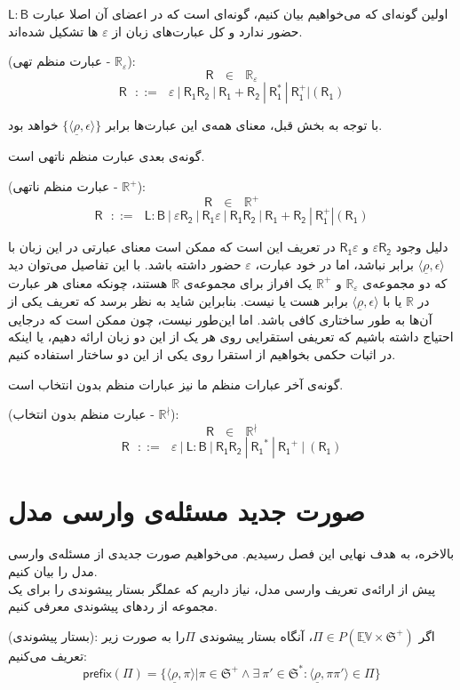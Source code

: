 اولین گونه‌ای که می‌خواهیم بیان کنیم، گونه‌ای است که در اعضای آن اصلا عبارت 
$\mathsf{L : B}$
حضور ندارد و کل عبارت‌های زبان از $\varepsilon$ ها تشکیل شده‌اند.
\begin{defn}
	(عبارت منظم تهی - $\mathbb{R_\varepsilon}$): 
	$$\mathsf{R} \:\:\:\in\:\:\: \mathbb{R}_\varepsilon$$
	$$\mathsf{R}\:\:\: ::= \:\:\: \varepsilon \: | \: \mathsf{R_1 R_2} \: | 
	\: \mathsf{R_1 + R_2} \: | \: \mathsf{R_1^*} \: | \: \mathsf{R_1^+} | (\mathsf{R_1})$$
\end{defn}


 با توجه به بخش قبل، معنای همه‌ی این عبارت‌ها برابر 
$\{\langle \underline{\rho} , \epsilon \rangle\}$
خواهد بود.

گونه‌ی بعدی عبارت منظم ناتهی است.
\begin{defn}
	(عبارت منظم ناتهی - $\mathbb{R}^+$):
	$$\mathsf{R} \:\:\:\in\:\:\: \mathbb{R}^+$$
	$$\mathsf{R}\:\:\: ::= \:\:\: \mathsf{L:B} \: |
	\: \mathsf{\varepsilon R_2} \: | \: \mathsf{R_1 \varepsilon} \: |
	\: \mathsf{R_1 R_2} \: | 
	\: \mathsf{R_1 + R_2} \: | \: \mathsf{R_1^+} | (\mathsf{R_1})$$
\end{defn}
دلیل وجود 
$\mathsf{\varepsilon R_2}$
و 
$\mathsf{R_1 \varepsilon}$
در تعریف این است که ممکن است معنای عبارتی در این زبان با ${\langle \underline{\rho} , \epsilon \rangle}$ برابر نباشد، اما در خود عبارت، $\varepsilon$ حضور داشته باشد. با این تفاصیل می‌توان دید که دو مجموعه‌ی 
$\mathbb{R}_\varepsilon$
و
$\mathbb{R}^+$
یک افراز برای مجموعه‌ی $\mathbb{R}$ هستند، چونکه معنای هر عبارت در $\mathbb{R}$ یا با ${\langle \underline{\rho} , \epsilon \rangle}$ برابر هست یا نیست. بنابراین شاید به نظر برسد که تعریف یکی از آن‌ها به طور ساختاری کافی باشد. اما این‌طور نیست، چون ممکن است که درجایی احتیاج داشته باشیم که تعریفی استقرایی روی هر یک از این دو زبان ارائه دهیم، یا اینکه در اثبات حکمی بخواهیم از استقرا روی یکی از این دو ساختار استفاده کنیم.

گونه‌ی آخر عبارات منظم ما نیز عبارات منظم بدون انتخاب است.
\begin{defn}
(عبارت منظم بدون انتخاب - $\mathbb{R}^\nmid$):
$$
\mathsf{R}\:\:\: \in \:\:\: \mathbb{R}^\nmid$$
$$
\mathsf{R}\:\:\: ::= \:\:\: \varepsilon \: | \: \mathsf{L:B} \: | \:
\mathsf{R_1 R_2} \: | \: \mathsf{R_1}^* \: | \: \mathsf{R_1}^+ \: | \:
(\mathsf{R_1})$$
\end{defn}

\section{صورت جدید مسئله‌ی وارسی مدل}
بالاخره، به هدف نهایی این فصل رسیدیم. می‌خواهیم صورت جدیدی از مسئله‌ی وارسی مدل را بیان ‌کنیم.\\
پیش از ارائه‌ی تعریف وارسی مدل، نیاز داریم که عملگر بستار پیشوندی را برای یک مجموعه از ردهای پیشوندی معرفی کنیم.
\begin{defn}
	(بستار پیشوندی):
	اگر 
	$\Pi \in \mathit{P}(\mathbb{\underline{EV}\times \mathfrak{S}^+})$،
	آنگاه بستار پیشوندی $\Pi$را به صورت زیر تعریف می‌کنیم:
	$$\mathsf{prefix}(\Pi)=
	\{\langle \underline{\rho},\pi\rangle | \pi \in \mathfrak{S^+} \land \exists\
	\pi' \in \mathfrak{S^*}: \langle \underline{\rho}, \pi \pi' \rangle \in \Pi \}$$
\end{defn}

